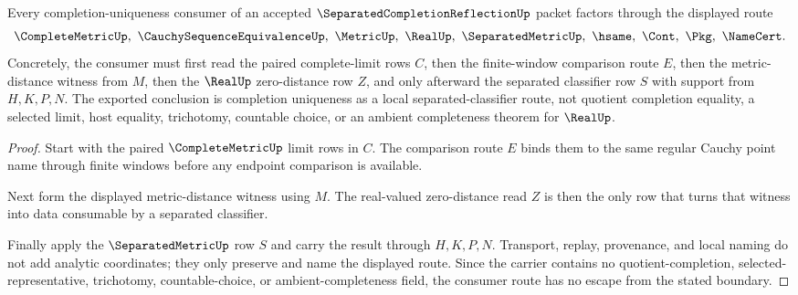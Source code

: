 \begin{theorem}
\label{thm:separated-completion-reflection-route}
Every completion-uniqueness consumer of an accepted $\SeparatedCompletionReflectionUp$ packet factors through the displayed route
$$
\CompleteMetricUp,\ \CauchySequenceEquivalenceUp,\ \MetricUp,\ \RealUp,\ \SeparatedMetricUp,\ \hsame,\ \Cont,\ \Pkg,\ \NameCert .
$$
Concretely, the consumer must first read the paired complete-limit rows $C$, then the finite-window comparison route $E$, then the metric-distance witness from $M$, then the $\RealUp$ zero-distance row $Z$, and only afterward the separated classifier row $S$ with support from $H,K,P,N$. The exported conclusion is completion uniqueness as a local separated-classifier route, not quotient completion equality, a selected limit, host equality, trichotomy, countable choice, or an ambient completeness theorem for $\RealUp$.
\end{theorem}
\begin{proof}
Start with the paired $\CompleteMetricUp$ limit rows in $C$. The comparison route $E$ binds them to the same regular Cauchy point name through finite windows before any endpoint comparison is available.

Next form the displayed metric-distance witness using $M$. The real-valued zero-distance read $Z$ is then the only row that turns that witness into data consumable by a separated classifier.

Finally apply the $\SeparatedMetricUp$ row $S$ and carry the result through $H,K,P,N$. Transport, replay, provenance, and local naming do not add analytic coordinates; they only preserve and name the displayed route. Since the carrier contains no quotient-completion, selected-representative, trichotomy, countable-choice, or ambient-completeness field, the consumer route has no escape from the stated boundary.
\end{proof}


